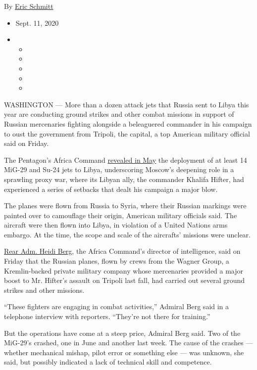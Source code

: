 By \href{https://www.nytimes3xbfgragh.onion/by/eric-schmitt}{Eric
Schmitt}

\begin{itemize}
\item
  Sept. 11, 2020
\item
  \begin{itemize}
  \item
  \item
  \item
  \item
  \item
  \end{itemize}
\end{itemize}

WASHINGTON --- More than a dozen attack jets that Russia sent to Libya
this year are conducting ground strikes and other combat missions in
support of Russian mercenaries fighting alongside a beleaguered
commander in his campaign to oust the government from Tripoli, the
capital, a top American military official said on Friday.

The Pentagon's Africa Command
\href{https://www.nytimes3xbfgragh.onion/2020/05/26/world/middleeast/russia-warplanes-libya.html}{revealed
in May} the deployment of at least 14 MiG-29 and Su-24 jets to Libya,
underscoring Moscow's deepening role in a sprawling proxy war, where its
Libyan ally, the commander Khalifa Hifter, had experienced a series of
setbacks that dealt his campaign a major blow.

The planes were flown from Russia to Syria, where their Russian markings
were painted over to camouflage their origin, American military
officials said. The aircraft were then flown into Libya, in violation of
a United Nations arms embargo. At the time, the scope and scale of the
aircrafts' missions were unclear.

\href{https://www.navy.mil/Leadership/Biographies/BioDisplay/Article/2236458/rear-admiral-heidi-berg/}{Rear
Adm. Heidi Berg}, the Africa Command's director of intelligence, said on
Friday that the Russian planes, flown by crews from the Wagner Group, a
Kremlin-backed private military company whose mercenaries provided a
major boost to Mr. Hifter's assault on Tripoli last fall, had carried
out several ground strikes and other missions.

``These fighters are engaging in combat activities,'' Admiral Berg said
in a telephone interview with reporters. ``They're not there for
training.''

But the operations have come at a steep price, Admiral Berg said. Two of
the MiG-29's crashed, one in June and another last week. The cause of
the crashes --- whether mechanical mishap, pilot error or something else
--- was unknown, she said, but possibly indicated a lack of technical
skill and competence.

